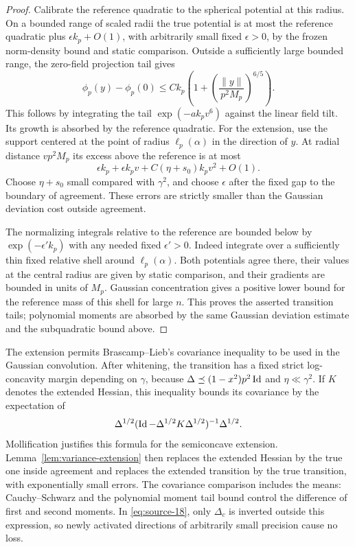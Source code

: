 \begin{proof}
Calibrate the reference quadratic to the spherical potential at this
radius. On a bounded range of scaled radii the true potential is at most
the reference quadratic plus $\epsilon k_p+O(1)$, with arbitrarily small fixed
$\epsilon>0$, by the frozen norm-density bound and static comparison.
Outside a sufficiently large bounded range, the zero-field projection
tail gives
\[
 \phi_p(y)-\phi_p(0)
 \le Ck_p\left(1+
       \left(\frac{\|y\|}{p^2M_p}\right)^{6/5}\right).
\]
This follows by integrating the tail
$\exp(-ak_pv^6)$ against the linear field tilt. Its growth is absorbed
by the reference quadratic. For the extension, use the support centered
at the point of radius $\ell_p(\alpha)$ in the direction of $y$.
At radial distance $vp^2M_p$ its excess above the reference is at most
\[
 \epsilon k_p+\epsilon k_pv+C(\eta+s_0)k_pv^2+O(1).
\]
Choose $\eta+s_0$ small compared with $\gamma^2$, and choose
$\epsilon$ after the fixed gap to the boundary of agreement. These errors
are strictly smaller than the Gaussian deviation cost outside agreement.

The normalizing integrals relative to the reference are bounded below
by $\exp(-\epsilon'k_p)$ with any needed fixed $\epsilon'>0$.
Indeed integrate over a sufficiently thin fixed relative shell around
$\ell_p(\alpha)$. Both potentials agree there, their values at the
central radius are given by static comparison, and their gradients are
bounded in units of $M_p$. Gaussian concentration gives a positive lower
bound for the reference mass of this shell for large $n$. This proves
the asserted transition tails; polynomial moments are absorbed by the
same Gaussian deviation estimate and the subquadratic bound above.
\end{proof}

The extension permits Brascamp--Lieb's covariance inequality
\cite{BrascampLieb1976} to be used in the Gaussian convolution. After
whitening, the transition has a fixed strict log-concavity margin depending
on $\gamma$, because
$\Delta\preceq(1-x^2)p^2\operatorname{Id}$ and $\eta\ll\gamma^2$. If $K$ denotes
the extended Hessian, this inequality bounds its covariance by the
expectation of
\[
 \Delta^{1/2}
 (\operatorname{Id}-\Delta^{1/2}K\Delta^{1/2})^{-1}\Delta^{1/2}.
\]
Mollification justifies this formula for the semiconcave extension.
Lemma~\ref{lem:variance-extension} then replaces the extended Hessian by
the true one inside agreement and replaces the extended transition by
the true transition, with exponentially small errors. The covariance
comparison includes the means: Cauchy--Schwarz and the polynomial moment
tail bound control the difference of first and second moments. In
\eqref{eq:source-18}, only $\Delta_c$ is inverted outside this expression,
so newly activated directions of arbitrarily small precision cause no loss.

